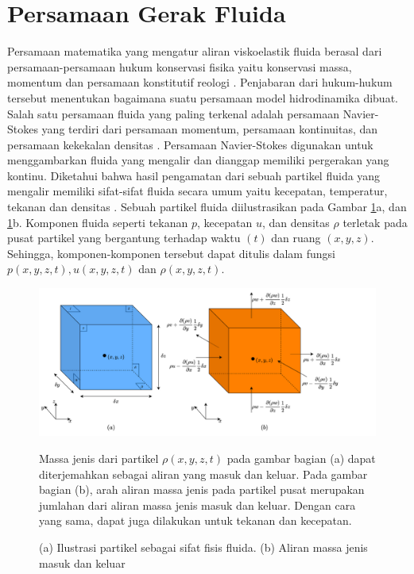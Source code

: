 \section[Persamaan Gerak Fluida]{Persamaan Gerak Fluida}
\begin{spacing}{1.5}
	
	Persamaan matematika yang mengatur aliran viskoelastik fluida berasal dari persamaan-persamaan hukum konservasi fisika yaitu konservasi massa, momentum dan persamaan konstitutif reologi . Penjabaran dari hukum-hukum tersebut menentukan bagaimana suatu persamaan model hidrodinamika dibuat. Salah satu persamaan fluida yang paling terkenal adalah persamaan Navier-Stokes yang terdiri dari persamaan momentum, persamaan kontinuitas, dan persamaan kekekalan densitas . Persamaan Navier-Stokes digunakan untuk menggambarkan fluida yang mengalir dan dianggap memiliki pergerakan yang kontinu. Diketahui bahwa hasil pengamatan dari sebuah partikel fluida yang mengalir memiliki sifat-sifat fluida secara umum yaitu kecepatan, temperatur, tekanan dan densitas . Sebuah partikel fluida diilustrasikan pada Gambar \ref{fig:cube}a, dan \ref{fig:cube}b. Komponen fluida seperti tekanan $p$, kecepatan $u$, dan densitas $\rho$ terletak pada pusat partikel yang bergantung terhadap waktu $(t)$ dan ruang $(x,y,z)$. Sehingga, komponen-komponen tersebut dapat ditulis dalam fungsi $p(x,y,z,t), u(x,y,z,t)$  dan $\rho(x,y,z,t)$. 
	
	\begin{figure}[H]
		\centering
		\includegraphics[width=16cm]{contents/cube}
		\caption{(a) Ilustrasi partikel sebagai sifat fisis fluida. (b) Aliran massa jenis masuk dan keluar \protect{}}
		\label{fig:cube}
		\medspace
		\small
		Massa jenis dari partikel $\rho(x,y,z,t)$ pada gambar bagian (a) dapat diterjemahkan sebagai aliran yang masuk dan keluar. Pada gambar bagian (b), arah aliran massa jenis pada partikel pusat merupakan jumlahan dari aliran massa jenis masuk dan keluar. Dengan cara yang sama, dapat juga dilakukan untuk tekanan dan kecepatan. 
	\end{figure}
	
\end{spacing}
\vspace{-1pc}
